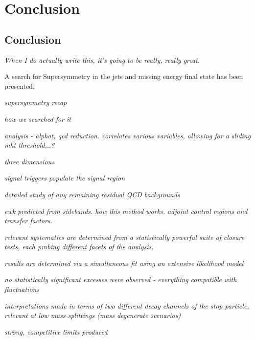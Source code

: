 \chapter{Conclusion}

\ifpdf
    \graphicspath{{Chapter10/Figs/Raster/}{Chapter10/Figs/PDF/}{Chapter10/Figs/}}
\else
    \graphicspath{{Chapter10/Figs/Vector/}{Chapter10/Figs/}}
\fi


\section{Conclusion}  %
\emph{When I do actually write this, it's going to be really, really great.}


A search for Supersymmetry in the jets and missing energy final state has been
presented.

\emph{supersymmetry recap}

\emph{how we searched for it}

\emph{analysis - alphat, qcd reduction. correlates various variables, allowing
for a sliding mht threshold...?}

\emph{three dimensions}

\emph{signal triggers populate the signal region}

\emph{detailed study of any remaining residual QCD backgrounds}

\emph{ewk predicted from sidebands. how this method works. adjoint control
regions and transfer factors.}

\emph{relevant systematics are determined from a statistically powerful suite
of closure tests, each probing different facets of the analysis.}

\emph{results are determined via a simultaneous fit using an extensive
likelihood model}

\emph{no statistically significant excesses were observed - everything
compatible with fluctuations}

\emph{interpretations made in terms of two different decay channels of the stop
particle, relevant at low mass splittings (mass degenerate scenarios)}

\emph{strong, competitive limits produced}

